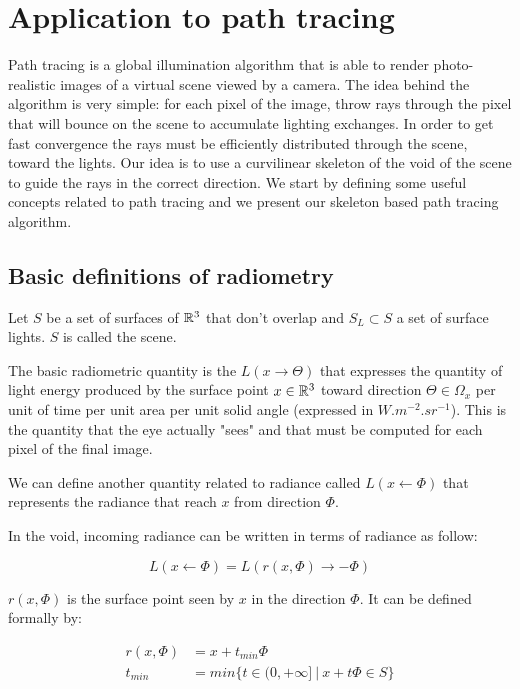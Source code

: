 

\section{Application to path tracing}

Path tracing is a global illumination algorithm that is able to render photo-realistic images of a virtual scene viewed by a camera. The idea behind the algorithm is very simple: for each pixel of the image, throw rays through the pixel that will bounce on the scene to accumulate lighting exchanges. In order to get fast convergence the rays must be efficiently distributed through the scene, toward the lights. Our idea is to use a curvilinear skeleton of the void of the scene to guide the rays in the correct direction. We start by defining some useful concepts related to path tracing and we present our skeleton based path tracing algorithm.

\subsection{Basic definitions of radiometry}

Let $S$ be a set of surfaces of $\mathbb{R}^3$ that don't overlap and $S_L \subset S$ a set of surface lights. $S$ is called the scene.

The basic radiometric quantity is the  $L(x \rightarrow \Theta)$ that expresses the quantity of light energy produced by the surface point $x \in \mathbb{R}^3$ toward direction $\Theta \in \Omega_x$ per unit of time per unit area per unit solid angle (expressed in $W.m^{-2}.sr^{-1}$).
This is the quantity that the eye actually "sees" and that must be computed for each pixel of the final image.


We can define another quantity related to radiance called  $L(x \leftarrow \Phi)$ that represents the radiance that reach $x$ from direction $\Phi$.

In the void, incoming radiance can be written in terms of radiance as follow:

\begin{equation*}
L(x \leftarrow \Phi) = L(r(x, \Phi) \rightarrow -\Phi)
\end{equation*}

$r(x, \Phi)$ is the surface point seen by $x$ in the direction $\Phi$. It can be defined formally by:

\begin{align*}
r(x, \Phi) &= x + t_{min}\Phi \\
t_{min} &= min \lbrace t \in (0, +\infty]~ |~ x + t\Phi \in S \rbrace
\end{align*}

